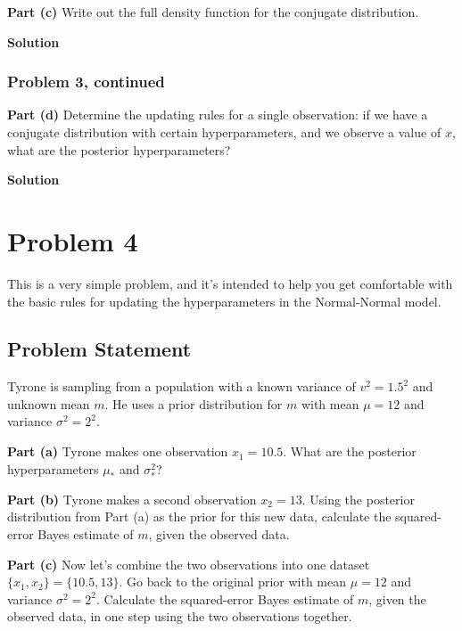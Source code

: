 \documentclass[12pt]{article}
\theoremstyle{definition}
\begin{document}
\vspace{3in}
\noindent
{\bf Part (c)} Write out the full density function for the conjugate distribution.

\bigskip
\noindent
{\bf Solution}





\newpage
\subsubsection*{Problem 3, continued}

\noindent
{\bf Part (d)} Determine the updating rules for a single observation: if we have a conjugate distribution with certain hyperparameters, and we observe a value of $x$, what are the posterior hyperparameters? 

\bigskip
\noindent
{\bf Solution}







\newpage
\section*{Problem 4}

This is a very simple problem, and it's intended to help you get comfortable with the basic rules for updating the hyperparameters in the Normal-Normal model.


\subsection*{Problem Statement}

Tyrone is sampling from a population with a known variance of $v^2 = 1.5^2$ and unknown mean $m$. He uses a prior distribution for $m$ with mean $\mu = 12$ and variance $\sigma^2 = 2^2$.

\bigskip
\noindent
{\bf Part (a)} Tyrone makes one observation $x_1 = 10.5$. What are the posterior hyperparameters $\mu_*$ and $\sigma_*^2$?

\bigskip
\noindent
{\bf Part (b)} Tyrone makes a second observation $x_2 = 13$. Using the posterior distribution from Part (a) as the prior for this new data, calculate the squared-error Bayes estimate of $m$, given the observed data.

\bigskip
\noindent
{\bf Part (c)} Now let's combine the two observations into one dataset $\{x_1, x_2\} = \{10.5, 13\}$. Go back to the original prior with mean $\mu = 12$ and variance $\sigma^2 = 2^2$. Calculate the squared-error Bayes estimate of $m$, given the observed data, in one step using the two observations together.
\end{document}
